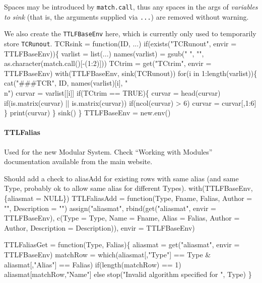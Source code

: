 \documentclass[a4paper]{article}
\begin{document}
Spaces may be introduced by \verb|match.call|, thus any spaces in the
args of \emph{variables to sink} (that is, the arguments supplied via
\verb|...|) are removed without warning.

We also create the \verb|TTLFBaseEnv| here, which is currently only
used to temporarily store \verb|TCRunout|.
\nwenddocs{}\endmoddef
TCRsink =
  function(ID, ...)
  if(exists("TCRunout", envir = TTLFBaseEnv))\{
    varlist = list(...)
    names(varlist) = gsub(" ", "", as.character(match.call()[-(1:2)]))
    TCtrim = get("TCtrim", envir = TTLFBaseEnv)
    with(TTLFBaseEnv, sink(TCRunout))
    for(i in 1:length(varlist))\{
      cat("###TCR", ID, names(varlist)[i], "\\n")
      curvar = varlist[[i]]
      if(TCtrim == TRUE)\{
        curvar = head(curvar)
        if(is.matrix(curvar) || is.matrix(curvar))
          if(ncol(curvar) > 6)
            curvar = curvar[,1:6]
      \}
      print(curvar)
    \}
    sink()
  \}
TTLFBaseEnv = new.env()
\eatline
{}\nwendcode{}\nwdocspar

\paragraph{TTLFalias}
Used for the new Modular System. Check ``Working with Modules''
documentation available from the main website.

Should add a check to aliasAdd for existing rows with same alias (and
same Type, probably ok to allow same alias for different Types).
\nwenddocs{}\endmoddef
with(TTLFBaseEnv, \{aliasmat = NULL\})
TTLFaliasAdd =
  function(Type, Fname, Falias, Author = "", Description = "")
  assign("aliasmat",
         rbind(get("aliasmat", envir = TTLFBaseEnv),
               c(Type = Type, Name = Fname, Alias = Falias,
                 Author = Author, Description = Description)),
         envir = TTLFBaseEnv)

TTLFaliasGet =
  function(Type, Falias)\{
    aliasmat = get("aliasmat", envir = TTLFBaseEnv)
    matchRow = which(aliasmat[,"Type"] == Type &
      aliasmat[,"Alias"] == Falias)
    if(length(matchRow) == 1)
      aliasmat[matchRow,"Name"]
    else stop("Invalid algorithm specified for ", Type)
  \}
\end{document}
